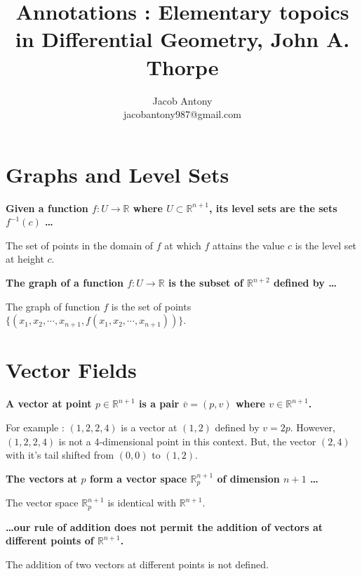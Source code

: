 \documentclass[a4paper,12pt,openany]{book}
\title{Annotations : Elementary topoics in Differential Geometry, John A. Thorpe}
\author{Jacob Antony\\jacobantony987@gmail.com}
\begin{document}
\maketitle

\chapter{Graphs and Level Sets}
\textbf{\phantom{}}
\textbf{Given a function $f : U \to \mathbb{R}$ where $U \subset \mathbb{R}^{n+1}$, its level sets are the sets $f^{-1}(c)$ \dots}\\
\begin{story}
	The set of points in the domain of $f$ at which $f$ attains the value $c$ is the level set at height $c$.
\end{story}

\textbf{\phantom{}}
\textbf{The graph of a function $f : U \to \mathbb{R}$ is the subset of $\mathbb{R}^{n+2}$ defined by \dots }\\
\begin{story}
	The graph of function $f$ is the set of points $\{ (x_1,x_2,\cdots,x_{n+1},f(x_1,x_2,\cdots,x_{n+1})) \}$.
\end{story}

\chapter{Vector Fields}
\textbf{\phantom{}}
\textbf{A vector at point $p \in \mathbb{R}^{n+1}$ is a pair $\bar{v} = (p,v)$ where $v \in \mathbb{R}^{n+1}$.}\\
\begin{story}
	For example : $(1,2,2,4)$ is a vector at $(1,2)$ defined by $v=2p$.
	However, $(1,2,2,4)$ is not a 4-dimensional point in this context.
	But, the vector $(2,4)$ with it's tail shifted from $(0,0)$ to $(1,2)$.
\end{story}

\textbf{\phantom{}}
\textbf{The vectors at $p$ form a vector space $\mathbb{R}^{n+1}_p$ of dimension $n+1$ \dots}\\
\begin{story}
	The vector space $\mathbb{R}^{n+1}_p$ is identical with $\mathbb{R}^{n+1}$.
\end{story}

\textbf{\phantom{}}
\textbf{\dots our rule of addition does not permit the addition of vectors at different points of $\mathbb{R}^{n+1}$.}\\
\begin{story}
	The addition of two vectors at different points is not defined.
\end{story}
\end{document}
